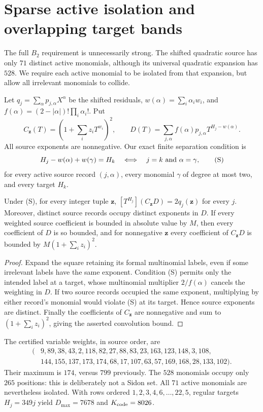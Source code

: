 \section{Sparse active isolation and overlapping target bands}
The full $B_2$ requirement is unnecessarily strong. The shifted quadratic
source has only $71$ distinct active monomials, although its universal
quadratic expansion has $528$. We require each active monomial to be isolated
from that expansion, but allow all irrelevant monomials to collide.

Let $q_j=\sum_\alpha p_{j,\alpha}X^\alpha$ be the shifted residuals,
$w(\alpha)=\sum_i\alpha_iw_i$, and
$f(\alpha)=(2-|\alpha|)!\prod_i\alpha_i!$. Put
\[
 C_{\mathbf z}(T)=\left(1+\sum_i z_iT^{w_i}\right)^2,
 \qquad D(T)=\sum_{j,\alpha}f(\alpha)p_{j,\alpha}
                       T^{H_j-w(\alpha)}.
\]
All source exponents are nonnegative. Our exact finite separation condition is
\[
 H_j-w(\alpha)+w(\gamma)=H_k
 \quad\Longleftrightarrow\quad j=k\ \hbox{and}\ \alpha=\gamma,
 \tag{S}
\]
for every active source record $(j,\alpha)$, every monomial $\gamma$ of
degree at most two, and every target $H_k$.

\begin{theorem}
Under \textup{(S)}, for every integer tuple $\mathbf z$,
$[T^{H_j}](C_{\mathbf z}D)=2q_j(\mathbf z)$ for every $j$.
Moreover, distinct source records occupy distinct exponents in $D$.
If every weighted source coefficient is bounded in absolute value by $M$,
then every coefficient of $D$ is so bounded, and for nonnegative $\mathbf z$
every coefficient of $C_{\mathbf z}D$ is bounded by
$M(1+\sum_i z_i)^2$.
\end{theorem}
\begin{proof}
Expand the square retaining its formal multinomial labels, even if some
irrelevant labels have the same exponent. Condition \textup{(S)} permits
only the intended label at a target, whose multinomial multiplier
$2/f(\alpha)$ cancels the weighting in $D$. If two source records occupied
the same exponent, multiplying by either record's monomial would violate
\textup{(S)} at its target. Hence source exponents are distinct.
Finally the coefficients of $C_{\mathbf z}$ are nonnegative and sum to
$(1+\sum_i z_i)^2$, giving the asserted convolution bound.
\end{proof}

The certified variable weights, in source order, are
\[
\begin{split}
(&9,89,38,43,2,118,82,27,88,83,23,163,123,148,3,108,\\
 &144,155,137,173,174,68,17,107,63,57,169,168,28,133,102).
\end{split}
\]
Their maximum is $174$, versus $799$ previously. The $528$ monomials
occupy only $265$ positions: this is deliberately not a Sidon set.
All $71$ active monomials are nevertheless isolated. With rows ordered
$1,2,3,4,6,\ldots,22,5$, regular targets $H_j=349j$ yield
$D_{\max}=7678$ and $K_{\rm code}=8026$.

